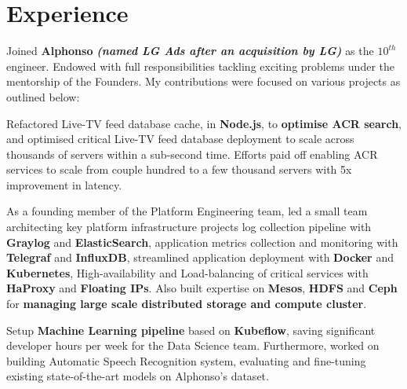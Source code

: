 \documentclass[]{deedy-resume-openfont}
\begin{document}
\begin{minipage}[t]{0.66\textwidth} 


\section{Experience}
\vspace{\topsep} %
\begin{tightemize}
\item Joined \textbf{Alphonso} {\footnotesize \textit{\textbf{(named LG Ads after an acquisition by LG) }}} as the $10^{th}$ engineer. Endowed with full responsibilities tackling exciting problems under the mentorship of the Founders. My contributions were focused on various projects as outlined below:
\item Refactored Live-TV feed database cache, in \textbf{Node.js}, to \textbf{optimise ACR search}, and optimised critical Live-TV feed database deployment to scale across thousands of servers within a sub-second time. Efforts paid off enabling ACR services to scale from couple hundred to a few thousand servers with 5x improvement in latency.
\item As a founding member of the Platform Engineering team, led a small team architecting key platform infrastructure projects \textemdash log collection pipeline with \textbf{Graylog} and \textbf{ElasticSearch}, application metrics collection and monitoring with \textbf{Telegraf} and \textbf{InfluxDB}, streamlined application deployment with \textbf{Docker} and \textbf{Kubernetes}, High-availability and Load-balancing of critical services with \textbf{HaProxy} and \textbf{Floating IPs}. Also built expertise on \textbf{Mesos}, \textbf{HDFS} and \textbf{Ceph} for \textbf{managing large scale distributed storage and compute cluster}.
\item Setup \textbf{Machine Learning pipeline} based on \textbf{Kubeflow}, saving significant developer hours per week for the Data Science team. Furthermore, worked on building Automatic Speech Recognition system, evaluating and fine-tuning existing
state-of-the-art models on Alphonso's dataset.
\end{tightemize}
\sectionsep


\end{minipage}
\end{document}
